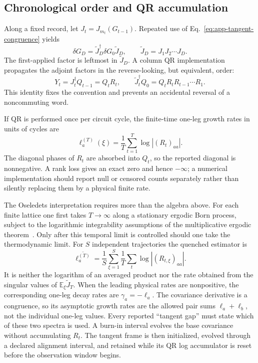 \subsection{Chronological order and QR accumulation}

Along a fixed record, let \(J_t=J_{m_t}(G_{t-1})\).  Repeated use of
Eq.~\eqref{eq:app-tangent-congruence} yields
\begin{equation}
    \delta G_D
    =\widetilde J_D^\dagger\delta G_0\widetilde J_D,
    \qquad
    \boxed{\widetilde J_D=J_1J_2\cdots J_D.}
    \label{eq:app-chronological-half-cocycle}
\end{equation}
The first-applied factor is leftmost in \(\widetilde J_D\).  A column QR
implementation propagates the adjoint factors in the reverse-looking, but
equivalent, order:
\begin{equation}
    Y_t=J_t^\dagger Q_{t-1}=Q_tR_t,
    \qquad
    \widetilde J_t^\dagger Q_0
    =Q_tR_tR_{t-1}\cdots R_1.
    \label{eq:app-qr-order}
\end{equation}
This identity fixes the convention and prevents an accidental reversal of a
noncommuting word.

If QR is performed once per circuit cycle, the finite-time one-leg growth
rates in units of cycles are
\begin{equation}
    \ell_a^{(T)}(\xi)
    =\frac{1}{T}\sum_{t=1}^{T}\log |(R_t)_{aa}|.
    \label{eq:app-finite-time-lyapunov}
\end{equation}
The diagonal phases of \(R_t\) are absorbed into \(Q_t\), so the reported
diagonal is nonnegative.  A rank loss gives an exact zero and hence
\(-\infty\); a numerical implementation should report null or censored
counts separately rather than silently replacing them by a physical finite
rate.

The Oseledets interpretation requires more than the algebra above.  For each
finite lattice one first takes \(T\to\infty\) along a stationary ergodic
Born process, subject to the logarithmic integrability assumptions of the
multiplicative ergodic theorem~\cite{Oseledec1968}.  Only after this temporal
limit is controlled should one take the thermodynamic limit.  For \(S\)
independent trajectories the quenched estimator is
\begin{equation}
    \overline{\ell_a^{(T)}}
    =\frac{1}{S}\sum_{\xi=1}^{S}
      \frac{1}{T}\sum_t\log |(R_{t,\xi})_{aa}|.
    \label{eq:app-quenched-lyapunov-estimator}
\end{equation}
It is neither the logarithm of an averaged product nor the rate obtained from
the singular values of \(\mathbb E_\xi\widetilde J_T\).  When the leading
physical rates are nonpositive, the corresponding one-leg decay rates are
\(\gamma_a=-\ell_a\).  The covariance derivative is a congruence, so its
asymptotic growth rates are the allowed pair sums \(\ell_a+\ell_b\), not the
individual one-leg values.  Every reported ``tangent gap'' must state which
of these two spectra is used.  A burn-in interval evolves the base covariance
without accumulating \(R_t\).  The tangent frame is then initialized, evolved
through a declared alignment interval, and retained while its QR log
accumulator is reset before the observation window begins.

